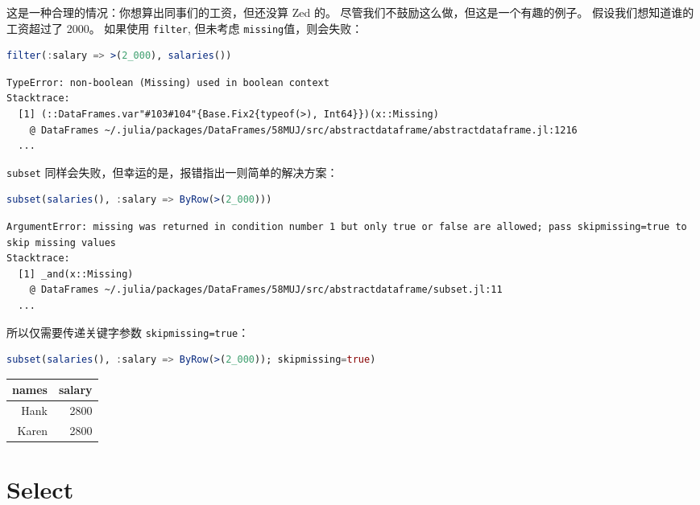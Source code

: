 \documentclass[
  notoc %
]{tufte-book}
\newcommand{\passthrough}[1]{#1}
\begin{document}
这是一种合理的情况：你想算出同事们的工资，但还没算 Zed 的。
尽管我们不鼓励这么做，但这是一个有趣的例子。
假设我们想知道谁的工资超过了 2000。 如果使用
\passthrough{\lstinline!filter!}, 但未考虑
\passthrough{\lstinline!missing!}值，则会失败：

\begin{lstlisting}[language=Julia]
filter(:salary => >(2_000), salaries())
\end{lstlisting}

\begin{lstlisting}[language=Output]
TypeError: non-boolean (Missing) used in boolean context
Stacktrace:
  [1] (::DataFrames.var"#103#104"{Base.Fix2{typeof(>), Int64}})(x::Missing)
    @ DataFrames ~/.julia/packages/DataFrames/58MUJ/src/abstractdataframe/abstractdataframe.jl:1216
  ...
\end{lstlisting}

\passthrough{\lstinline!subset!}
同样会失败，但幸运的是，报错指出一则简单的解决方案：

\begin{lstlisting}[language=Julia]
subset(salaries(), :salary => ByRow(>(2_000)))
\end{lstlisting}

\begin{lstlisting}[language=Output]
ArgumentError: missing was returned in condition number 1 but only true or false are allowed; pass skipmissing=true to skip missing values
Stacktrace:
  [1] _and(x::Missing)
    @ DataFrames ~/.julia/packages/DataFrames/58MUJ/src/abstractdataframe/subset.jl:11
  ...
\end{lstlisting}

所以仅需要传递关键字参数 \passthrough{\lstinline!skipmissing=true!}：

\begin{lstlisting}[language=Julia]
subset(salaries(), :salary => ByRow(>(2_000)); skipmissing=true)
\end{lstlisting}

\begin{longtable}[]{@{}rr@{}}
\toprule
names & salary \\
\midrule
\endhead
Hank & 2800 \\
Karen & 2800 \\
\bottomrule
\end{longtable}

\hypertarget{sec:select}{%
\section{Select}\label{sec:select}}
\end{document}
